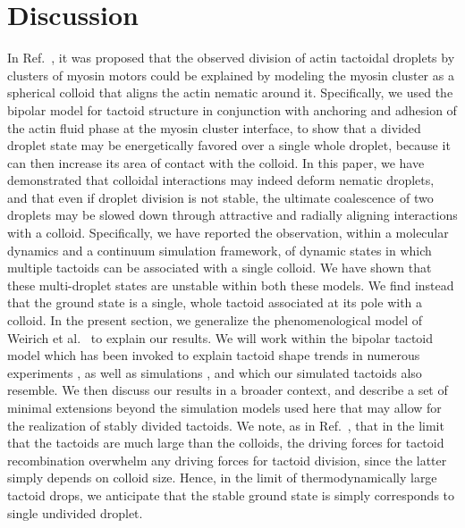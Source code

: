 \documentclass[%
 aip,
 amsmath,amssymb,
 reprint,%
]{revtex4-1}
\begin{document}
\section{Discussion} \label{sec:tactoidDiscussion}
In Ref.~, it was proposed that the observed division of actin tactoidal droplets by clusters of myosin motors could be explained by modeling the myosin cluster as a spherical colloid that aligns the actin nematic around it. Specifically, we used the bipolar model for tactoid structure in conjunction with anchoring and adhesion of the actin fluid phase at the myosin cluster interface, to show that a divided droplet state may be energetically favored over a single whole droplet, because it can then increase its area of contact with the colloid. In this paper, we have demonstrated that colloidal interactions may indeed deform nematic droplets, and that even if droplet division is not stable, the ultimate coalescence of two droplets may be slowed down through attractive and radially aligning interactions with a colloid. Specifically, we have reported the observation, within a molecular dynamics and a continuum simulation framework, of dynamic states in which multiple tactoids can be associated with a single colloid. We have shown that these multi-droplet states are unstable within both these models. We find instead that the ground state is a single, whole tactoid associated at its pole with a colloid. In the present section, we generalize the phenomenological model of Weirich et al.~\cite{Weirich19} to explain our results. We will work within the bipolar tactoid model \cite{Taraskin02,vdS03} which has been invoked to explain tactoid shape trends in numerous experiments
\cite{exptAspectRatio1,exptAspectRatio2, exptAspectRatio3, exptAspectRatio4, exptAspectRatio5, exptAspectRatio6, exptAspectRatio7}, as well as simulations \cite{Trukhina2009, Atherton16}, and which our simulated tactoids also resemble.  We then discuss our results in a broader context, and describe a set of minimal extensions beyond the simulation models used here that may allow for the realization of stably divided tactoids. We note, as in Ref.~, that in the limit that the tactoids are much large than the colloids, the driving forces for tactoid recombination overwhelm any driving forces for tactoid division, since the latter simply depends on colloid size. Hence, in the limit of thermodynamically large tactoid drops, we anticipate that the stable ground state is simply corresponds to single undivided droplet. 
\end{document}
